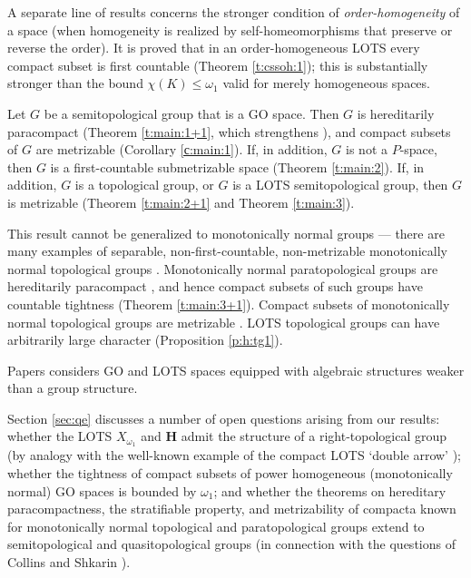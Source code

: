 \documentclass[preprint]{elsarticle}
\def\om{\omega}
\theoremstyle{definition}
\theoremstyle{remark}
\def\Hs{\mathbf{H}}
\begin{document}
A separate line of results concerns the stronger condition of \emph{order-homogeneity} of a space (when homogeneity is realized by self-homeomorphisms that preserve or reverse the order). It is proved that in an order-homogeneous LOTS every compact subset is first countable (Theorem \ref{t:cssoh:1}); this is substantially stronger than the bound $\chi(K)\leq \om_1$ valid for merely homogeneous spaces.

Let $G$ be a semitopological group that is a GO space. Then $G$ is hereditarily paracompact (Theorem \ref{t:main:1+1}, which strengthens \cite[Corollary 2.7.]{BuzyakovaVural2014}), and compact subsets of $G$ are metrizable (Corollary \ref{с:main:1}).
If, in addition, $G$ is not a $P$-space, then $G$ is a first-countable submetrizable space (Theorem \ref{t:main:2}).
If, in addition, $G$ is a topological group, or $G$ is a LOTS semitopological group, then $G$ is metrizable (Theorem \ref{t:main:2+1} and Theorem \ref{t:main:3}).

This result cannot be generalized to monotonically normal groups --- there are many examples of separable, non-first-countable, non-metrizable monotonically normal topological groups \cite{GartsideReznichenko2000nmfs}. Monotonically normal paratopological groups are hereditarily paracompact \cite[Theorem 2.6]{BuzyakovaVural2014}, and hence compact subsets of such groups have countable tightness \cite[Theorem 3.5]{WilliamsZhou1998} (Theorem \ref{t:main:3+1}). Compact subsets of monotonically normal topological groups are metrizable \cite[Theorem 2a]{Gartside1998}.
LOTS topological groups can have arbitrarily large character (Proposition \ref{p:h:tg1}).


Papers \cite{BennettBurkeLutzer2013} considers GO and LOTS spaces equipped with algebraic structures weaker than a group structure.

Section \ref{sec:qe} discusses a number of open questions arising from our results: whether the LOTS $X_{\om_1}$ and $\Hs$ admit the structure of a right-topological group (by analogy with the well-known example of the compact LOTS `double arrow' \cite{Banakh2008}); whether the tightness of compact subsets of power homogeneous (monotonically normal) GO spaces is bounded by $\om_1$; and whether the theorems on hereditary paracompactness, the stratifiable property, and metrizability of compacta known for monotonically normal topological and paratopological groups extend to semitopological and quasitopological groups (in connection with the questions of Collins \cite[Problem 6]{Collins1996} and Shkarin \cite[Remarks (2)]{Shkarin2004}).
\end{document}
